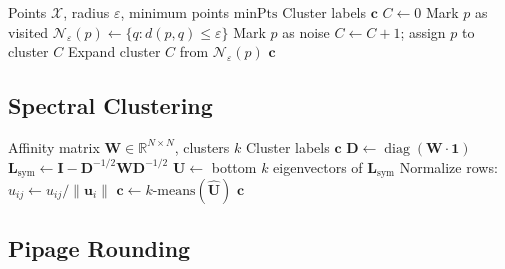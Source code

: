 \documentclass[11pt]{article}
\DeclareMathOperator{\diag}{diag}
\begin{document}
\begin{algorithm}[H]
\caption{DBSCAN~\citep{ester1996density}}
\label{alg:dbscan}
\begin{algorithmic}[1]
\Require Points $\mathcal{X}$, radius $\varepsilon$, minimum points $\text{minPts}$
\Ensure Cluster labels $\mathbf{c}$
\State $C \gets 0$ 
  \State Mark $p$ as visited
  \State $\mathcal{N}_\varepsilon(p) \gets \{q : d(p,q) \leq \varepsilon\}$
    \State Mark $p$ as noise
  \Else
    \State $C \gets C + 1$; assign $p$ to cluster $C$
    \State Expand cluster $C$ from $\mathcal{N}_\varepsilon(p)$
  \EndIf
\EndFor
\State \Return $\mathbf{c}$
\end{algorithmic}
\end{algorithm}

\subsection{Spectral Clustering}

\begin{algorithm}[H]
\caption{Spectral Clustering~\citep{ng2002spectral}}
\label{alg:spectral}
\begin{algorithmic}[1]
\Require Affinity matrix $\mathbf{W} \in \mathbb{R}^{N \times N}$, clusters $k$
\Ensure Cluster labels $\mathbf{c}$
\State $\mathbf{D} \gets \diag(\mathbf{W} \cdot \mathbf{1})$ 
\State $\mathbf{L}_{\text{sym}} \gets \mathbf{I} - \mathbf{D}^{-1/2} \mathbf{W} \mathbf{D}^{-1/2}$ 
\State $\mathbf{U} \gets$ bottom $k$ eigenvectors of $\mathbf{L}_{\text{sym}}$
\State Normalize rows: $\hat{u}_{ij} \gets u_{ij} / \|\mathbf{u}_i\|$
\State $\mathbf{c} \gets k\text{-means}(\hat{\mathbf{U}})$
\State \Return $\mathbf{c}$
\end{algorithmic}
\end{algorithm}

\subsection{Pipage Rounding}
\end{document}
